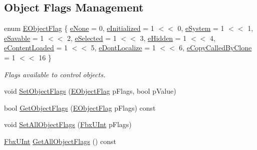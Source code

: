 \subsection*{Object Flags Management}
\begin{DoxyCompactItemize}
\item 
enum \hyperlink{class_fbx_object_a117b8002963e9fe475a93556c217b244}{E\+Object\+Flag} \{ \newline
\hyperlink{class_fbx_object_a117b8002963e9fe475a93556c217b244a1e3be60c132e4128211bcae9151b7394}{e\+None} = 0, 
\hyperlink{class_fbx_object_a117b8002963e9fe475a93556c217b244aef7e1bffd6a66da3afcef75a5b58099c}{e\+Initialized} = 1 $<$$<$ 0, 
\hyperlink{class_fbx_object_a117b8002963e9fe475a93556c217b244ab30526fefc7c765c86915837cb78d194}{e\+System} = 1 $<$$<$ 1, 
\hyperlink{class_fbx_object_a117b8002963e9fe475a93556c217b244a9d477bbe1f04724fcc65b40b0ed25634}{e\+Savable} = 1 $<$$<$ 2, 
\newline
\hyperlink{class_fbx_object_a117b8002963e9fe475a93556c217b244a46eb7a51468eab26cdfaf4ff5ba94f7b}{e\+Selected} = 1 $<$$<$ 3, 
\hyperlink{class_fbx_object_a117b8002963e9fe475a93556c217b244a003e4ca99b413e36199255548e54e0a6}{e\+Hidden} = 1 $<$$<$ 4, 
\hyperlink{class_fbx_object_a117b8002963e9fe475a93556c217b244ad4bf6f05e3c50e585dec611288da91c6}{e\+Content\+Loaded} = 1 $<$$<$ 5, 
\hyperlink{class_fbx_object_a117b8002963e9fe475a93556c217b244ace826129cda639eeb41fa034268d1f93}{e\+Dont\+Localize} = 1 $<$$<$ 6, 
\newline
\hyperlink{class_fbx_object_a117b8002963e9fe475a93556c217b244aaac8a289575d6365b97978c9b7bb104c}{e\+Copy\+Called\+By\+Clone} = 1 $<$$<$ 16
 \}\begin{DoxyCompactList}\small\item\em Flags available to control objects. \end{DoxyCompactList}
\item 
void \hyperlink{class_fbx_object_a38333e180ca371f76495267a26cccb08}{Set\+Object\+Flags} (\hyperlink{class_fbx_object_a117b8002963e9fe475a93556c217b244}{E\+Object\+Flag} p\+Flags, bool p\+Value)
\item 
bool \hyperlink{class_fbx_object_a02d91c1f2930a03cfd0e8c2b1fffa0ee}{Get\+Object\+Flags} (\hyperlink{class_fbx_object_a117b8002963e9fe475a93556c217b244}{E\+Object\+Flag} p\+Flags) const
\item 
void \hyperlink{class_fbx_object_aa59f051b6c0be5f93eb88cc2f15b43e5}{Set\+All\+Object\+Flags} (\hyperlink{fbxtypes_8h_ae9fb141d8158a730aa85ec5ff2ea3f6b}{Fbx\+U\+Int} p\+Flags)
\item 
\hyperlink{fbxtypes_8h_ae9fb141d8158a730aa85ec5ff2ea3f6b}{Fbx\+U\+Int} \hyperlink{class_fbx_object_a18b30c43de008570c05f3a6f1e46eb10}{Get\+All\+Object\+Flags} () const
\end{DoxyCompactItemize}
